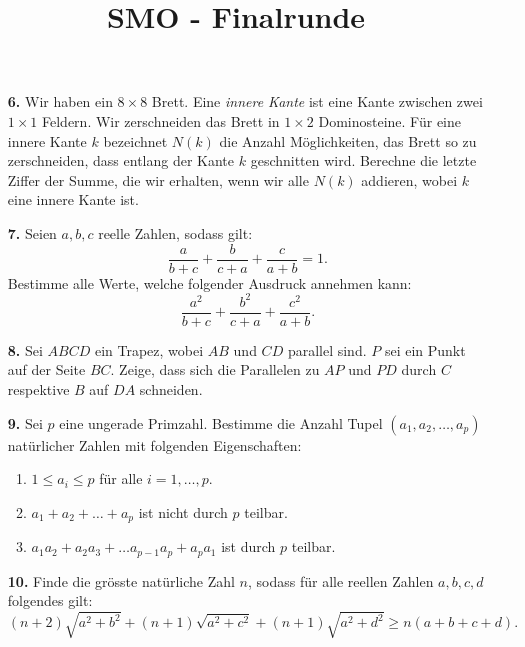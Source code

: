 \documentclass[language=german,style=exam]{smo}
\title{SMO - Finalrunde}
\begin{document}
\begin{enumerate}

\item[\textbf{6.}] 
Wir haben ein $8 \times 8$ Brett. Eine \emph{innere Kante} ist eine Kante zwischen zwei $1 \times 1$ Feldern. Wir zerschneiden das Brett in $1 \times 2$ Dominosteine. Für eine innere Kante $k$ bezeichnet $N(k)$ die Anzahl Möglichkeiten, das Brett so zu zerschneiden, dass entlang der Kante $k$ geschnitten wird. Berechne die letzte Ziffer der Summe, die wir erhalten, wenn wir alle $N(k)$ addieren, wobei $k$ eine innere Kante ist.

\bigskip

\item[\textbf{7.}] Seien $a,b,c$ reelle Zahlen, sodass gilt:
\[
\frac{a}{b+c}+\frac{b}{c+a}+\frac{c}{a+b} = 1.
\]
Bestimme alle Werte, welche folgender Ausdruck annehmen kann:
\[
\frac{a^2}{b+c}+\frac{b^2}{c+a}+\frac{c^2}{a+b}.
\]

\bigskip

\item[\textbf{8.}] Sei $ABCD$ ein Trapez, wobei $AB$ und $CD$ parallel sind. $P$ sei ein Punkt auf der Seite $BC$. Zeige, dass sich die Parallelen zu $AP$ und $PD$ durch $C$ respektive $B$ auf $DA$ schneiden.

\bigskip

\item[\textbf{9.}] Sei $p$ eine ungerade Primzahl. Bestimme die Anzahl Tupel $(a_1,a_2,\dots,a_p)$ natürlicher Zahlen mit folgenden Eigenschaften:
\begin{enumerate}[1)]
\item $1\leq a_i\leq p$ für alle $i=1,\dots,p$.
\item $a_1+a_2+\dots +a_p$ ist nicht durch $p$ teilbar.
\item $a_1a_2 + a_2a_3 +\dots a_{p-1}a_p + a_pa_1$ ist durch $p$ teilbar.
\end{enumerate}

\bigskip

\item[\textbf{10.}] Finde die grösste natürliche Zahl $n$, sodass für alle reellen Zahlen $a,b,c,d$ folgendes gilt:
\[
(n+2) \sqrt{a^2+b^2} + (n+1) \sqrt{a^2+c^2} + (n+1)\sqrt{a^2+d^2} \geq n(a+b+c+d).
\]

\bigskip

\end{enumerate}

\vspace{1cm}

\end{document}
